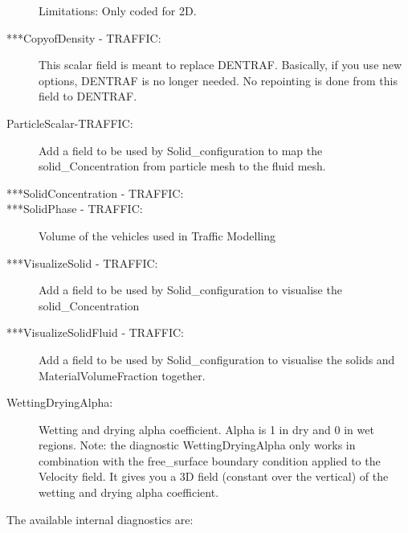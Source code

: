 \begin{description}
Limitations: Only coded for 2D.
\item[***CopyofDensity - TRAFFIC:]This scalar field is meant to replace DENTRAF. Basically, if you use new options, DENTRAF is no longer needed. No repointing is done from this field to DENTRAF. 
\item[ParticleScalar-TRAFFIC:]Add a field to be used by Solid\_configuration to map the solid\_Concentration from particle mesh to the fluid mesh. 
\item[***SolidConcentration - TRAFFIC:]  
\item[***SolidPhase - TRAFFIC:]Volume of the vehicles used in Traffic Modelling 
\item[***VisualizeSolid - TRAFFIC:]Add a field to be used by Solid\_configuration to visualise the solid\_Concentration 
\item[***VisualizeSolidFluid - TRAFFIC:]Add a field to be used by Solid\_configuration to visualise the solids and MaterialVolumeFraction together.
\item[WettingDryingAlpha:]Wetting and drying alpha coefficient. Alpha is 1 in dry and 0 in wet regions. Note: the diagnostic WettingDryingAlpha only works in combination with the free\_surface boundary condition applied to the Velocity field. It gives you a 3D field (constant over the vertical) of the wetting and drying alpha coefficient.
\end{description}

The available internal   diagnostics are:

